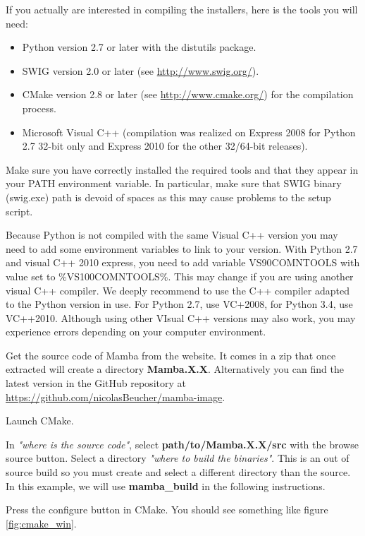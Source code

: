 \documentclass[a4paper,10pt,oneside]{article}
\begin{document}
If you actually are interested in compiling the installers, here is the tools
you will need:

\begin{itemize}
\item Python version 2.7 or later with the distutils package.
\item SWIG version 2.0 or later (see \url{http://www.swig.org/}).
\item CMake version 2.8 or later (see \url{http://www.cmake.org/}) for the 
compilation process.
\item Microsoft Visual C++ (compilation was realized on Express 2008 for Python 2.7 32-bit
only and Express 2010 for the other 32/64-bit releases).
\end{itemize}

Make sure you have correctly installed the required tools and that they appear
in your PATH environment variable. In particular, make sure that SWIG binary
(swig.exe) path is devoid of spaces as this may cause problems to the setup
script.

Because Python is not compiled with the same Visual C++ version you may need
to add some environment variables to link to your version. With Python 2.7
and visual C++ 2010 express, you need to add variable VS90COMNTOOLS with
value set to \%VS100COMNTOOLS\%. This may change if you are using
another visual C++ compiler.
We deeply recommend to use the C++ compiler adapted to the Python version in use.
For Python 2.7, use VC+2008, for Python 3.4, use VC++2010. Although using other VIsual
C++ versions may also work, you may experience errors depending on your computer
environment.

Get the source code of Mamba from the website. It comes in a zip that once
extracted will create a directory \textbf{Mamba.X.X}. Alternatively you can
find the latest version in the GitHub repository at 
\url{https://github.com/nicolasBeucher/mamba-image}.

Launch CMake.

In \textit{"where is the source code"}, select \textbf{path/to/Mamba.X.X/src} with
the browse source button. Select a directory \textit{"where to build the binaries"}.
This is an out of source build so you must create and select a different
directory than the source. In this example, we will use
\textbf{mamba\_build} in the following instructions.

Press the configure button in CMake. You should see something like
figure \ref{fig:cmake_win}.
\end{document}
